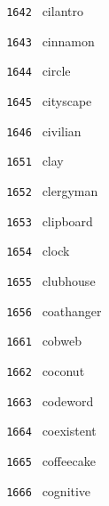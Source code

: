 \documentclass[11pt]{article}
\begin{document}
\begin{multicols}{6}
\noindent \texttt{ 1642 } \hspace{1mm} cilantro  \par
\noindent \texttt{ 1643 } \hspace{1mm} cinnamon  \par
\noindent \texttt{ 1644 } \hspace{1mm} circle  \par
\noindent \texttt{ 1645 } \hspace{1mm} cityscape  \par
\noindent \texttt{ 1646 } \hspace{1mm} civilian  \par
\noindent \texttt{ 1651 } \hspace{1mm} clay  \par
\noindent \texttt{ 1652 } \hspace{1mm} clergyman  \par
\noindent \texttt{ 1653 } \hspace{1mm} clipboard  \par
\noindent \texttt{ 1654 } \hspace{1mm} clock  \par
\noindent \texttt{ 1655 } \hspace{1mm} clubhouse  \par
\noindent \texttt{ 1656 } \hspace{1mm} coathanger  \par
\noindent \texttt{ 1661 } \hspace{1mm} cobweb  \par
\noindent \texttt{ 1662 } \hspace{1mm} coconut  \par
\noindent \texttt{ 1663 } \hspace{1mm} codeword  \par
\noindent \texttt{ 1664 } \hspace{1mm} coexistent  \par
\noindent \texttt{ 1665 } \hspace{1mm} coffeecake  \par
\noindent \texttt{ 1666 } \hspace{1mm} cognitive  \par
\end{multicols}
\end{document}
